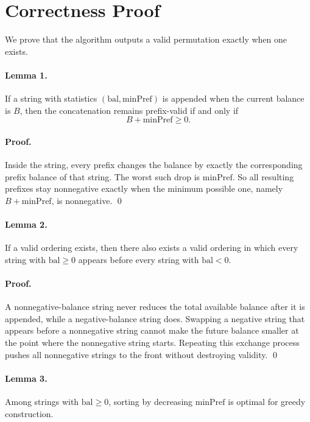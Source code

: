 \documentclass[11pt]{article}
\begin{document}
\section*{Correctness Proof}

We prove that the algorithm outputs a valid permutation exactly when one exists.

\paragraph{Lemma 1.}
If a string with statistics $(\text{bal}, \text{minPref})$ is appended when the current balance is $B$, then
the concatenation remains prefix-valid if and only if
\[
    B + \text{minPref} \ge 0.
\]

\paragraph{Proof.}
Inside the string, every prefix changes the balance by exactly the corresponding prefix balance of that
string. The worst such drop is $\text{minPref}$. So all resulting prefixes stay nonnegative exactly when
the minimum possible one, namely $B+\text{minPref}$, is nonnegative. \qed

\paragraph{Lemma 2.}
If a valid ordering exists, then there also exists a valid ordering in which every string with
$\text{bal} \ge 0$ appears before every string with $\text{bal} < 0$.

\paragraph{Proof.}
A nonnegative-balance string never reduces the total available balance after it is appended, while a
negative-balance string does. Swapping a negative string that appears before a nonnegative string cannot
make the future balance smaller at the point where the nonnegative string starts. Repeating this exchange
process pushes all nonnegative strings to the front without destroying validity. \qed

\paragraph{Lemma 3.}
Among strings with $\text{bal} \ge 0$, sorting by decreasing $\text{minPref}$ is optimal for greedy
construction.
\end{document}
